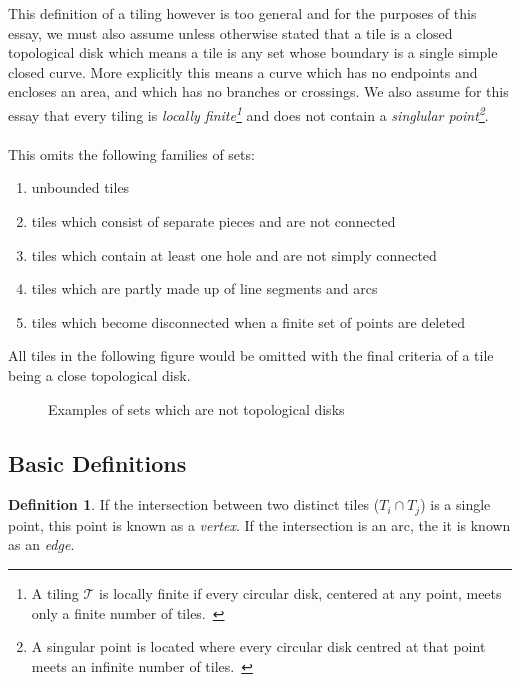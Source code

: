 \documentclass[a4paper,12pt,twoside,abstraction,titlepage]{article}
\theoremstyle{remark}
\theoremstyle{definition}
\newtheorem{definition}{Definition}[section]
\begin{document}
\noindent This definition of a tiling however is too general and for the purposes of this essay, we must also assume unless otherwise stated that a tile is a closed topological disk which means a tile is any set whose boundary is a single simple closed curve. More explicitly this means a curve which has no endpoints and encloses an area, and which has no branches or crossings. We also assume for this essay that every tiling is \emph{locally finite\footnote{A tiling $\mathscr{T}$ is locally finite if every circular disk, centered at any point, meets only a finite number of tiles.~\cite[\S 3.1]{branko}}} and does not contain a \emph{singlular point\footnote{A singular point is located where every circular disk centred at that point meets an infinite number of tiles.~\cite[\S 3.1]{branko}}}.~\cite[\S 1.1, \S 3.1]{branko}\\\\

\noindent This omits the following families of sets:

\begin{enumerate}
\item unbounded tiles 
\item tiles which consist of separate pieces and are not connected
\item tiles which contain at least one hole and are not simply connected
\item tiles which are partly made up of line segments and arcs
\item tiles which become disconnected when a finite set of points are deleted
\end{enumerate}

\noindent All tiles in the following figure would be omitted with the final criteria of a tile being a close topological disk.

\begin{figure}[!hbtp]
\makebox[\textwidth]{\framebox[5cm]{\rule{0pt}{5cm}}}
\caption{Examples of sets which are not topological disks~\cite[p17]{branko}}
\end{figure}


\subsection{Basic Definitions}
\begin{definition}\label{edgevertex}
If the intersection between two distinct tiles ($T_i \cap T_j$) is a single point, this point is known as a \emph{vertex}. If the intersection is an arc, the it is known as an \emph{edge}.~\cite[\S 1.1]{branko}
\end{definition}
\end{document}
